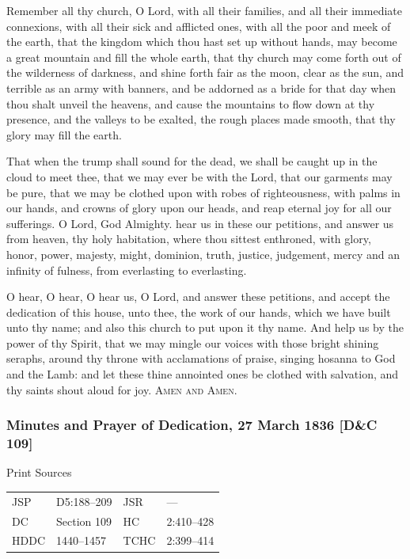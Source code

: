 					Remember all thy church, O Lord, with all their families, and all their immediate connexions, with all their sick and afflicted ones, with all the poor and meek of the earth, that the kingdom which thou hast set up without hands, may become a great mountain and fill the whole earth, that thy church may come forth out of the wilderness of darkness, and shine forth fair as the moon, clear as the sun, and terrible as an army with banners, and be addorned as a bride for that day when thou shalt unveil the heavens, and cause the mountains to flow down at thy presence, and the valleys to be exalted, the rough places made smooth, that thy glory may fill the earth.

					That when the trump shall sound for the dead, we shall be caught up in the cloud to meet thee, that we may ever be with the Lord, that our garments may be pure, that we may be clothed upon with robes of righteousness, with palms in our hands, and crowns of glory upon our heads, and reap eternal joy for all our sufferings. O Lord, God Almighty. hear us in these our petitions, and answer us from heaven, thy holy habitation, where thou sittest enthroned, with glory, honor, power, majesty, might, dominion, truth, justice, judgement, mercy and an infinity of fulness, from everlasting to everlasting.

					O hear, O hear, O hear us, O Lord, and answer these petitions, and accept the dedication of this house, unto thee, the work of our hands, which we have built unto thy name; and also this church to put upon it thy name. And help us by the power of thy Spirit, that we may mingle our voices with those bright shining seraphs, around thy throne with acclamations of praise, singing hosanna to God and the Lamb: and let these thine annointed ones be clothed with salvation, and thy saints shout aloud for joy. \textsc{Amen and Amen}.
					
		\subsubsection{Minutes and Prayer of Dedication, 27 March 1836 [D\&C 109]}
			\label{EMS-1836-JS-27-MAR-1836-MIN}
			
			\begin{description}
					\item[Print Sources]
				\end{description}

					\begin{tabular}{p{0.5in}p{1in}p{0.5in}p{1in}}
					JSP	 	& D5:188--209		& JSR 		& --- \\
					DC	 	& Section 109		& HC 		& 2:410--428 \\
					HDDC 	& 1440--1457		& TCHC 		& 2:399--414 \\
					\end{tabular}
				

